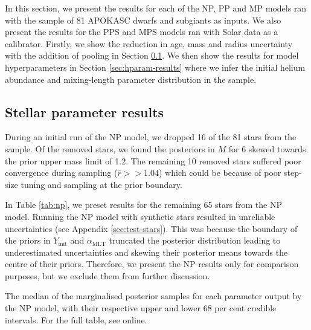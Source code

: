 \documentclass[a4paper,fleqn,usenatbib]{mnras}
\newcommand{\mlt}{\ensuremath{{\alpha_\mathrm{MLT}}}}
\begin{document}


In this section, we present the results for each of the NP, PP and MP models ran with the sample of 81 APOKASC dwarfs and subgiants as inputs. We also present the results for the PPS and MPS models ran with Solar data as a calibrator. Firstly, we show the reduction in age, mass and radius uncertainty with the addition of pooling in Section \ref{sec:param-results}. We then show the results for model hyperparameters in Section \ref{sec:hparam-results} where we infer the initial helium abundance and mixing-length parameter distribution in the sample.

\subsection{Stellar parameter results}\label{sec:param-results}

During an initial run of the NP model, we dropped 16 of the 81 stars from the sample. Of the removed stars, we found the posteriors in $M$ for 6 skewed towards the prior upper mass limit of \SI{1.2}{\solarmass}. The remaining 10 removed stars suffered poor convergence during sampling ($\hat{r} >> 1.04$) which could be because of poor step-size tuning and sampling at the prior boundary.

In Table \ref{tab:np}, we preset results for the remaining 65 stars from the NP model. Running the NP model with synthetic stars resulted in unreliable uncertainties (see Appendix \ref{sec:test-stars}). This was because the boundary of the priors in $Y_\mathrm{init}$ and $\mlt$ truncated the posterior distribution leading to underestimated uncertainties and skewing their posterior means towards the centre of their priors. Therefore, we present the NP results only for comparison purposes, but we exclude them from further discussion.

\begin{table}
	\centering
	\caption{The median of the marginalised posterior samples for each parameter output by the NP model, with their respective upper and lower 68 per cent credible intervals. For the full table, see online.}
	\label{tab:np}
	
\end{table}
\end{document}
